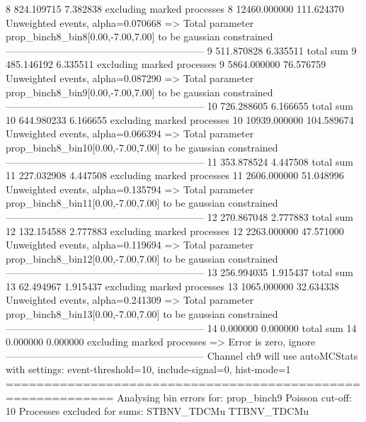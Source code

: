 8          824.109715      7.382838        excluding marked processes    
8          12460.000000    111.624370      Unweighted events, alpha=0.070668
  => Total parameter prop_binch8_bin8[0.00,-7.00,7.00] to be gaussian constrained
------------------------------------------------------------
9          511.870828      6.335511        total sum                     
9          485.146192      6.335511        excluding marked processes    
9          5864.000000     76.576759       Unweighted events, alpha=0.087290
  => Total parameter prop_binch8_bin9[0.00,-7.00,7.00] to be gaussian constrained
------------------------------------------------------------
10         726.288605      6.166655        total sum                     
10         644.980233      6.166655        excluding marked processes    
10         10939.000000    104.589674      Unweighted events, alpha=0.066394
  => Total parameter prop_binch8_bin10[0.00,-7.00,7.00] to be gaussian constrained
------------------------------------------------------------
11         353.878524      4.447508        total sum                     
11         227.032908      4.447508        excluding marked processes    
11         2606.000000     51.048996       Unweighted events, alpha=0.135794
  => Total parameter prop_binch8_bin11[0.00,-7.00,7.00] to be gaussian constrained
------------------------------------------------------------
12         270.867048      2.777883        total sum                     
12         132.154588      2.777883        excluding marked processes    
12         2263.000000     47.571000       Unweighted events, alpha=0.119694
  => Total parameter prop_binch8_bin12[0.00,-7.00,7.00] to be gaussian constrained
------------------------------------------------------------
13         256.994035      1.915437        total sum                     
13         62.494967       1.915437        excluding marked processes    
13         1065.000000     32.634338       Unweighted events, alpha=0.241309
  => Total parameter prop_binch8_bin13[0.00,-7.00,7.00] to be gaussian constrained
------------------------------------------------------------
14         0.000000        0.000000        total sum                     
14         0.000000        0.000000        excluding marked processes    
  => Error is zero, ignore      
------------------------------------------------------------
Channel ch9 will use autoMCStats with settings: event-threshold=10, include-signal=0, hist-mode=1
============================================================
Analysing bin errors for: prop_binch9
Poisson cut-off: 10
Processes excluded for sums: STBNV_TDCMu TTBNV_TDCMu
